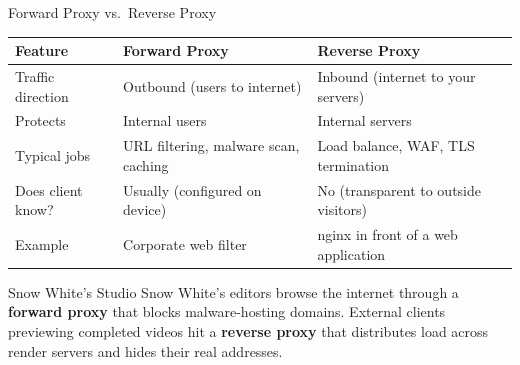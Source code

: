 \documentclass[aspectratio=169]{beamer}  %
\begin{document}
\begin{frame}{Forward Proxy vs.\ Reverse Proxy}
    \footnotesize
    \begin{table}[]
        \renewcommand{\arraystretch}{1.3}
        \centering
        \begin{tabular}{|l|l|l|}
        \hline
        \rowcolor[HTML]{EFEFEF}
        \textbf{Feature} & \textbf{Forward Proxy} & \textbf{Reverse Proxy} \\ \hline
        Traffic direction & Outbound (users to internet) & Inbound (internet to your servers) \\ \hline
        Protects & Internal users & Internal servers \\ \hline
        Typical jobs & URL filtering, malware scan, caching & Load balance, WAF, TLS termination \\ \hline
        Does client know? & Usually (configured on device) & No (transparent to outside visitors) \\ \hline
        Example & Corporate web filter & nginx in front of a web application \\ \hline
        \end{tabular}
    \end{table}

    \vspace{0.3em}
    \begin{exampleblock}{Snow White's Studio}
        \footnotesize
        Snow White's editors browse the internet through a \textbf{forward proxy} that blocks malware-hosting domains. External clients previewing completed videos hit a \textbf{reverse proxy} that distributes load across render servers and hides their real addresses.
    \end{exampleblock}
\end{frame}
\end{document}
